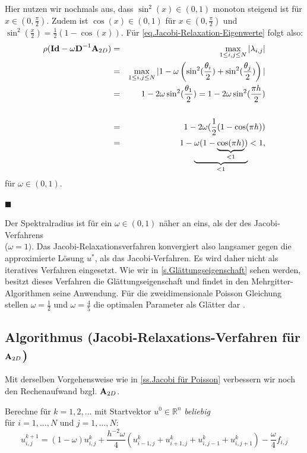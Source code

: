 Hier nutzen wir nochmals aus, dass $\sin^{2}(x) \in (0,1)$ monoton steigend ist für $x \in (0, \frac{\pi}{2})$. Zudem ist $\cos(x) \in (0,1)$ für $x \in (0,\frac{\pi}{2})$ und $\sin^{2}(\frac{x}{2}) = \frac{1}{2} (1 - \cos(x))$.
Für \autoref{eq.Jacobi-Relaxation-Eigenwerte} folgt also:
\begin{eqnarray}
\rho({\textbf{Id}}-\omega{\textbf{D}}^{-1}{\textbf{A}}_{2D}) &=& \max_{1 \le i,j \le N} | \lambda_{i,j} | \notag \\
&=& \max_{1 \le i,j \le N} | 1 - \omega \left(\sin^{2}(\frac {\theta_{i}} {2}) + \sin^{2}(\frac {\theta_{j}} {2}) \right) | \notag \\
&=& 1 - 2 \omega \sin^{2} (\frac {\theta_{1}} {2}) = 1 - 2 \omega \sin^{2} (\frac {\pi h} {2}) \notag \\ \notag \\
&=& 1 - 2 \omega (\frac{1} {2} (1 - \cos (\pi h)) \notag \\
&=& 1 - \underbrace{\omega(1 - \underbrace{\cos (\pi h)}_{< 1})}_{< 1} < 1, \notag
\end{eqnarray}
für $\omega \in (0,1)$.
\begin{flushright}
$\blacksquare$
\end{flushright}

Der Spektralradius ist für ein $\omega \in (0,1)$ näher an eins, als der des Jacobi-Verfahrens \\($\omega = 1)$. Das Jacobi-Relaxationsverfahren konvergiert also langsamer gegen die approximierte Lösung $u^{*}$, als das Jacobi-Verfahren. Es wird daher nicht als iteratives Verfahren eingesetzt. Wie wir in \autoref{s.Glättungseigenschaft} sehen werden, besitzt dieses Verfahren die Glättungseigenschaft und findet in den Mehrgitter-Algorithmen seine Anwendung. Für die zweidimensionale Poisson Gleichung stellen $\omega = \frac{1}{2}$ und $\omega = \frac{4}{5}$ die optimalen Parameter als Glätter dar \cite{SAAD4}.

\subsection{Algorithmus (Jacobi-Relaxations-Verfahren für ${\textbf{A}}_{2D}$)}\label{ss.Algorithmus Jacobi Relax Poisson}

Mit derselben Vorgehensweise wie in \autoref{ss.Jacobi für Poisson} verbessern wir noch den Rechenaufwand bzgl. ${\textbf{A}}_{2D}$.

Berechne für $k = 1,2,...$ mit Startvektor $u^{0} \in \mathbb{R}^{n}$ \textit{beliebig}\\
für $i = 1,...,N$ und $j = 1,...,N$:
\begin{equation}
u^{k+1}_{i,j} = (1 - \omega) u^{k}_{i,j} + \frac{h^{-2} \omega}{4} (u^{k}_{i-1,j} + u^{k}_{i+1,j} + u^{k}_{i,j-1} + u^{k}_{i,j+1}) - \frac{\omega}{4} f_{i,j}
\end{equation}

